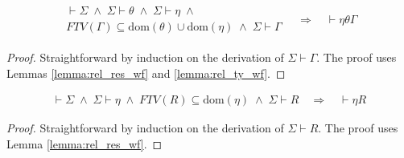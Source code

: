 \begin{lemma}
\label{lemma:rel_te_wf}
\begin{align*}
\begin{aligned}
\vdash \Sigma\;\land\;
\Sigma \vdash \theta\;\land\;
\Sigma \vdash \eta\;\land\;\\
FTV(\Gamma) \subseteq \mathrm{dom}(\theta)\cup\mathrm{dom}(\eta)\;\land\;
\Sigma \vdash \Gamma
\end{aligned}
\quad\Longrightarrow\quad
\vdash \eta\theta\Gamma
\end{align*}
\end{lemma}
\begin{proof}
Straightforward by induction on the derivation of $\Sigma \vdash \Gamma$. The proof uses Lemmas \ref{lemma:rel_res_wf} and \ref{lemma:rel_ty_wf}.
\end{proof}

\begin{lemma}
\label{lemma:rel_re_wf}
\begin{align*}
\vdash \Sigma\;\land\;
\Sigma \vdash \eta\;\land\;
FTV(R) \subseteq \mathrm{dom}(\eta)\;\land\;
\Sigma \vdash R
\quad\Longrightarrow\quad
\vdash \eta R
\end{align*}
\end{lemma}
\begin{proof}
Straightforward by induction on the derivation of $\Sigma \vdash R$. The proof uses Lemma \ref{lemma:rel_res_wf}.
\end{proof}

